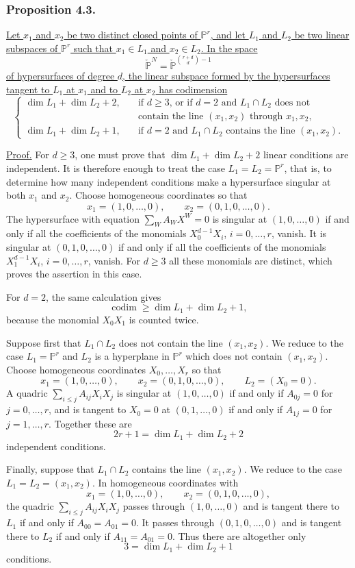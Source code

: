 \subsubsection*{Proposition 4.3.}
\underline{Let $x_1$ and $x_2$ be two distinct closed points of
$\mathbb P^r$, and let $L_1$ and $L_2$ be two linear subspaces of
$\mathbb P^r$ such that $x_1\in L_1$ and $x_2\in L_2$.  In the space}
\[
\check{\mathbb P}^{N}
=\check{\mathbb P}^{\binom{r+d}{d}-1}
\]
\underline{of hypersurfaces of degree $d$, the linear subspace formed
by the hypersurfaces tangent to $L_1$ at $x_1$ and to $L_2$ at $x_2$
has codimension}
\[
\left\{
\begin{aligned}
\dim L_1+\dim L_2+2,
 &\quad\text{if $d\geq3$, or if $d=2$ and $L_1\cap L_2$ does not}\\[-0.2ex]
 &\quad\text{contain the line $(x_1,x_2)$ through $x_1,x_2$},\\[1ex]
\dim L_1+\dim L_2+1,
 &\quad\text{if $d=2$ and $L_1\cap L_2$ contains the line $(x_1,x_2)$.}
\end{aligned}
\right.
\]

\noindent\underline{Proof.}
For $d\geq3$, one must prove that
$\dim L_1+\dim L_2+2$ linear conditions are independent.  It is
therefore enough to treat the case
$L_1=L_2=\mathbb P^r$, that is, to determine how many independent
conditions make a hypersurface singular at both $x_1$ and $x_2$.
Choose homogeneous coordinates so that
\[
x_1=(1,0,\ldots,0),\qquad x_2=(0,1,0,\ldots,0).
\]
The hypersurface with equation $\sum_W A_WX^W=0$ is singular at
$(1,0,\ldots,0)$ if and only if all the coefficients of the monomials
$X_0^{d-1}X_i$, $i=0,\ldots,r$, vanish.  It is singular at
$(0,1,0,\ldots,0)$ if and only if all the coefficients of the
monomials $X_1^{d-1}X_i$, $i=0,\ldots,r$, vanish.  For $d\geq3$ all
these monomials are distinct, which proves the assertion in this case.

For $d=2$, the same calculation gives
\[
\operatorname{codim}\geq\dim L_1+\dim L_2+1,
\]
because the monomial $X_0X_1$ is counted twice.

Suppose first that $L_1\cap L_2$ does not contain the line
$(x_1,x_2)$.  We reduce to the case $L_1=\mathbb P^r$ and $L_2$ is a
hyperplane in $\mathbb P^r$ which does not contain $(x_1,x_2)$.
Choose homogeneous coordinates $X_0,\ldots,X_r$ so that
\[
x_1=(1,0,\ldots,0),\qquad x_2=(0,1,0,\ldots,0),
\qquad L_2=(X_0=0).
\]
A quadric $\sum_{i\leq j}A_{ij}X_iX_j$ is singular at
$(1,0,\ldots,0)$ if and only if $A_{0j}=0$ for $j=0,\ldots,r$, and
is tangent to $X_0=0$ at $(0,1,\ldots,0)$ if and only if
$A_{1j}=0$ for $j=1,\ldots,r$.  Together these are
\[
2r+1=\dim L_1+\dim L_2+2
\]
independent conditions.

Finally, suppose that $L_1\cap L_2$ contains the line $(x_1,x_2)$.
We reduce to the case $L_1=L_2=(x_1,x_2)$.  In homogeneous
coordinates with
\[
x_1=(1,0,\ldots,0),\qquad x_2=(0,1,0,\ldots,0),
\]
the quadric $\sum_{i\leq j}A_{ij}X_iX_j$ passes through
$(1,0,\ldots,0)$ and is tangent there to $L_1$ if and only if
$A_{00}=A_{01}=0$.  It passes through $(0,1,0,\ldots,0)$ and is
tangent there to $L_2$ if and only if $A_{11}=A_{01}=0$.  Thus there
are altogether only
\[
3=\dim L_1+\dim L_2+1
\]
conditions.
